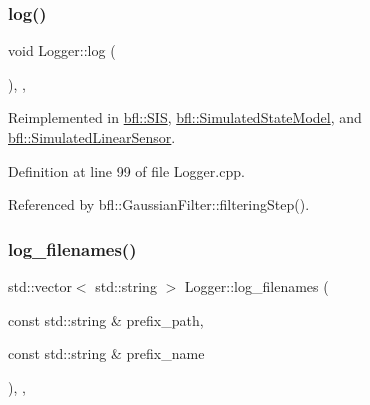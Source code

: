 \mbox{\label{classbfl_1_1Logger_ad44f46593cb8c4c87c1178eb326e2f64}} 
\subsubsection{\texorpdfstring{log()}{log()}}
{\footnotesize\ttfamily void Logger\+::log (\begin{DoxyParamCaption}{ }\end{DoxyParamCaption})\hspace{0.3cm}{\ttfamily [protected]}, {\ttfamily [virtual]}, {\ttfamily [inherited]}}



Reimplemented in \mbox{\hyperlink{classbfl_1_1SIS_aeb0b87af1cc1fc4b616989ef489ecccc}{bfl\+::\+S\+IS}}, \mbox{\hyperlink{classbfl_1_1SimulatedStateModel_aa022eb0d50d898ffcc831af2907265b2}{bfl\+::\+Simulated\+State\+Model}}, and \mbox{\hyperlink{classbfl_1_1SimulatedLinearSensor_ab75bbe744d8516c97dfc90ad499b10e6}{bfl\+::\+Simulated\+Linear\+Sensor}}.



Definition at line 99 of file Logger.\+cpp.



Referenced by bfl\+::\+Gaussian\+Filter\+::filtering\+Step().

\mbox{\label{classbfl_1_1Logger_a328ceaa8e70e6918f11142b12b8be217}} 
\subsubsection{\texorpdfstring{log\+\_\+filenames()}{log\_filenames()}}
{\footnotesize\ttfamily std\+::vector$<$ std\+::string $>$ Logger\+::log\+\_\+filenames (\begin{DoxyParamCaption}\item[{const std\+::string \&}]{prefix\+\_\+path,  }\item[{const std\+::string \&}]{prefix\+\_\+name }\end{DoxyParamCaption})\hspace{0.3cm}{\ttfamily [protected]}, {\ttfamily [virtual]}, {\ttfamily [inherited]}}




